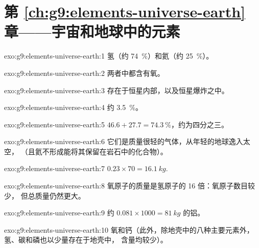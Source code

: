 \section*{第 \ref{ch:g9:elements-universe-earth} 章——宇宙和地球中的元素}

\begin{solution}{exo:g9:elements-universe-earth:1}
氢（约 \qty{74}{\percent}）和氦（约
\qty{25}{\percent}）。
\end{solution}

\begin{solution}{exo:g9:elements-universe-earth:2}
两者中都含有氧。
\end{solution}

\begin{solution}{exo:g9:elements-universe-earth:3}
存在于恒星内部，以及恒星爆炸之中。
\end{solution}

\begin{solution}{exo:g9:elements-universe-earth:4}
约 \qty{3.5}{\percent}。
\end{solution}

\begin{solution}{exo:g9:elements-universe-earth:5}
$46.6 + 27.7 = \qty{74.3}{\percent}$，约为四分之三。
\end{solution}

\begin{solution}{exo:g9:elements-universe-earth:6}
它们是质量很轻的气体，从年轻的地球逸入太空，
（且氦不形成能将其保留在岩石中的化合物）。
\end{solution}

\begin{solution}{exo:g9:elements-universe-earth:7}
$0.23 \times 70 = \qty{16.1}{kg}$.
\end{solution}

\begin{solution}{exo:g9:elements-universe-earth:8}
氧原子的质量是氢原子的 16 倍：氧原子数目较少，
但总质量仍然更大。
\end{solution}

\begin{solution}{exo:g9:elements-universe-earth:9}
约 $0.081 \times 1000 = \qty{81}{kg}$ 的铝。
\end{solution}

\begin{solution}{exo:g9:elements-universe-earth:10}
氧和钙（此外，除地壳中的八种主要元素外，
氢、碳和磷也以少量存在于地壳中，
含量均较少）。
\end{solution}

